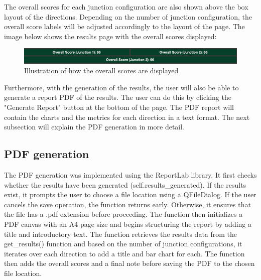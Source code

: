 \documentclass{article}
\begin{document}
    The overall scores for each junction configuration are also shown above the box layout of the directions. Depending on the number of junction configuration,
    the overall score labels will be adjusted accordingly to the layout of the page. The image below shows the results page with the overall scores displayed:

    \begin{figure}[H]
        \centering
        \includegraphics[width=\textwidth]{overallScores}
        \caption{Illustration of how the overall scores are displayed}
        \label{fig:overallScores}
    \end{figure}

    Furthermore, with the generation of the results, the user will also be able to generate a report PDF of the results. The user can do this by clicking the "Generate Report" button at the bottom of the page.
    The PDF report will contain the charts and the metrics for each direction in a text format. The next subsection will explain the PDF generation in more detail.

    \subsection{PDF generation}

    The PDF generation was implemented using the ReportLab library. It first checks whether the results have been generated (self.results\_generated). If the results exist, it prompts the user to choose a file
    location using a QFileDialog. If the user cancels the save operation, the function returns early. Otherwise, it ensures that the file has a .pdf extension before proceeding. The function then initializes a
    PDF canvas with an A4 page size and begins structuring the report by adding a title and introductory text. The function retrieves the results data from the get\_results() function and based on the number of junction
    configurations, it iterates over each direction to add a title and bar chart for each. The function then adds the overall scores and a final note before saving the PDF to the chosen file location.
\end{document}
